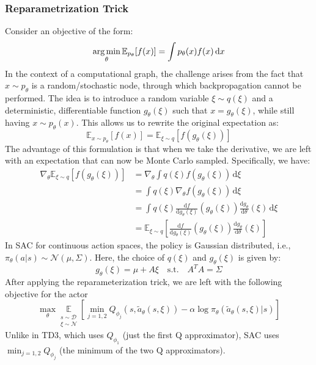 \subsubsection{Reparametrization Trick}\label{reparametrization_trick}
Consider an objective of the form:
$$\operatorname*{arg\,min}\limits_\theta \mathbb{E}_{p_\theta}[f(x)] = \int p_\theta(x) f(x) \, \mathrm{d}x$$
In the context of a computational graph, the challenge arises from the fact that $x \sim p_\theta $
is a random/stochastic node, through which backpropagation cannot be performed.\newline
The idea is to introduce a random variable $\xi \sim q(\xi)$ and a deterministic, differentiable function $g_\theta(\xi)$ 
such that $x = g_\theta(\xi)$, while still having $x \sim p_\theta(x)$. This allows us to rewrite the original expectation as:
$$\mathbb{E}_{x \sim p_\theta}[f(x)] = \mathbb{E}_{\xi \sim q}[f(g_\theta(\xi))]$$
The advantage of this formulation is that when we take the derivative, we are left with an expectation that can 
now be Monte Carlo sampled. Specifically, we have:
\begin{align*}
\nabla_\theta \mathbb{E}_{\xi \sim q}[f(g_\theta(\xi))] &= \nabla_\theta \int q(\xi) f(g_\theta(\xi)) \, \mathrm{d}\xi \\
&= \int q(\xi) \nabla_\theta f(g_\theta(\xi)) \, \mathrm{d}\xi \\
&= \int q(\xi) \frac{\mathrm{d} f}{\mathrm{d} g_\theta(\xi)}(g_\theta(\xi)) \frac{\mathrm{d} g_\theta}{\mathrm{d} \theta}(\xi) 
\, \mathrm{d}\xi \\
&= \mathbb{E}_{\xi \sim q}\left[ \frac{\mathrm{d} f}{\mathrm{d} g_\theta(\xi)}(g_\theta(\xi)) \frac{\mathrm{d} g_\theta}{\mathrm{d} \theta}
(\xi)\right]
\end{align*}
In SAC for continuous action spaces, the policy is Gaussian distributed, i.e., $\pi_\theta(a|s) \sim \mathcal{N}(\mu, \Sigma)$. Here, the 
choice of $q(\xi)$ and $g_\theta(\xi)$ is given by:
$$g_\theta(\xi) = \mu + A\xi \quad \text{s.t.} \quad A^T A = \Sigma$$
After applying the reparameterization trick, we are left with the following objective for the actor
$$\max_{\theta} \underset{\substack{s \sim \mathcal{D} \\ \xi \sim \mathcal{N}}}{\mathbb{E}}\left[{\min_{j=1,2} Q_{\phi_j}
(s,\tilde{a}_{\theta}(s,\xi)) - \alpha \log \pi_{\theta}(\tilde{a}_{\theta}(s,\xi)|s)}\right]$$
Unlike in TD3, which uses $Q_{\phi_1}$ (just the first Q approximator), SAC uses $\min_{j=1,2} Q_{\phi_j}$ (the minimum of the two Q approximators).
